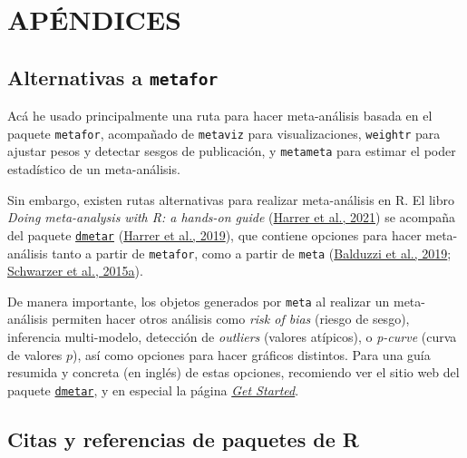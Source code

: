 \documentclass[
  bookmarksnumbered]{article}
\begin{document}
\newpage

\hypertarget{apuxe9ndices}{%
\section*{APÉNDICES}\label{apuxe9ndices}}

\hypertarget{alternativas-a-metafor}{%
\subsection*{\texorpdfstring{Alternativas a \texttt{metafor}}{Alternativas a metafor}}\label{alternativas-a-metafor}}

Acá he usado principalmente una ruta para hacer meta-análisis basada en el paquete \texttt{metafor}, acompañado de \texttt{metaviz} para visualizaciones, \texttt{weightr} para ajustar pesos y detectar sesgos de publicación, y \texttt{metameta} para estimar el poder estadístico de un meta-análisis.

Sin embargo, existen rutas alternativas para realizar meta-análisis en R. El libro \emph{Doing meta-analysis with R: a hands-on guide} (\protect\hyperlink{ref-harrer2021doing}{Harrer et al., 2021}) se acompaña del paquete \href{https://dmetar.protectlab.org/index.html}{\texttt{dmetar}} (\protect\hyperlink{ref-Harrer2019dmetar}{Harrer et al., 2019}), que contiene opciones para hacer meta-análisis tanto a partir de \texttt{metafor}, como a partir de \texttt{meta} (\protect\hyperlink{ref-BalduzziMeta2019}{Balduzzi et al., 2019}; \protect\hyperlink{ref-schwarzerMetaAnalysis2015}{Schwarzer et al., 2015a}).

De manera importante, los objetos generados por \texttt{meta} al realizar un meta-análisis permiten hacer otros análisis como \emph{risk of bias} (riesgo de sesgo), inferencia multi-modelo, detección de \emph{outliers} (valores atípicos), o \emph{p-curve} (curva de valores \(p\)), así como opciones para hacer gráficos distintos. Para una guía resumida y concreta (en inglés) de estas opciones, recomiendo ver el sitio web del paquete \href{http://dmetar.protectlab.org/}{\texttt{dmetar}}, y en especial la página \href{https://dmetar.protectlab.org/articles/dmetar.html}{\emph{Get Started}}.

\hypertarget{citas-y-referencias-de-paquetes-de-r}{%
\subsection*{Citas y referencias de paquetes de R}\label{citas-y-referencias-de-paquetes-de-r}}
\end{document}
